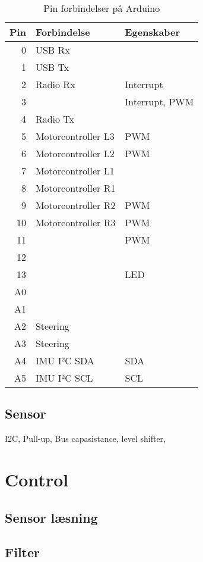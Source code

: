 \documentclass[a4paper,oneside,article,danish,table,draft]{memoir}
\begin{document}
\begin{table}[htbp]
  \caption[]{Pin forbindelser på Arduino}
  \centering
  \begin{tabular}{rll}
      \toprule
      Pin & Forbindelse & Egenskaber\\
      \midrule
      0 & USB Rx & \\
      1 & USB Tx & \\
      2 & Radio Rx & Interrupt\\
      3 & & Interrupt, PWM\\
      4 & Radio Tx & \\
      5 & Motorcontroller L3 & PWM\\
      6 & Motorcontroller L2 & PWM\\
      7 & Motorcontroller L1 & \\
      8 & Motorcontroller R1 & \\
      9 & Motorcontroller R2 & PWM\\
      10 & Motorcontroller R3 & PWM\\
      11 & & PWM\\
      12 & & \\
      13 & & LED\\
      A0 & & \\
      A1 & & \\
      A2 & Steering & \\
      A3 & Steering & \\
      A4 & IMU I²C SDA & SDA\\
      A5 & IMU I²C SCL & SCL
    \end{tabular}
  \end{table}

\subsection{Sensor}
I2C, Pull-up, Bus capasistance, level shifter,

\section{Control}

\subsection{Sensor læsning}

\subsection{Filter}
\end{document}
